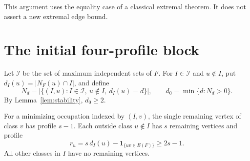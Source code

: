 \documentclass[11pt]{article}
\theoremstyle{remark}\newtheorem{remark}[theorem]{Remark}
\newcommand{\cI}{\mathcal I}
\begin{document}
This argument uses the equality case of a classical extremal
theorem. It does not assert a new extremal edge bound.

\section{The initial four-profile block}

Let $\cI$ be the set of maximum independent sets of $F$.
For $I\in\cI$ and $u\notin I$, put $d_I(u)=|N_F(u)\cap I|$, and define
\begin{equation}
 N_d=\bigl|\{(I,u): I\in\cI,\ u\notin I,\ d_I(u)=d\}\bigr|,
 \qquad d_0=\min\{d:N_d>0\}.                    \label{eq:Nd}
\end{equation}
By Lemma~\ref{lem:stability}, $d_0\ge2$.

For a minimizing occupation indexed by $(I,v)$, the single remaining
vertex of class $v$ has profile $s-1$. Each outside class $u\notin I$
has $s$ remaining vertices and profile
\begin{equation}
 r_u=s\,d_I(u)-\mathbf 1_{\{uv\in E(F)\}}\ge2s-1.
                                                        \label{eq:profiles}
\end{equation}
All other classes in $I$ have no remaining vertices.
\end{document}
